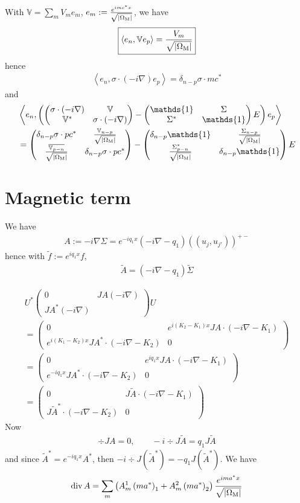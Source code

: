 \documentclass[11pt,a4paper,reqno,french,tikz]{amsart}
\newcommand{\pa}[1]{\left( #1 \right)} %
\newcommand{\ab}[1]{\left|#1\right|} %
\newcommand{\ps}[1]{\left< #1 \right>} %
\newcommand{\na}{\nabla} %
\newcommand{\f}[2]{\frac{#1}{#2}} %
\newcommand{\ind}[1]{_{\textup{#1}}} %
\newcommand{\mat}[1]{\begin{pmatrix} #1 \end{pmatrix}} %
\def\1{{\mathds{1}}}
\newcommand{\bbV}{\mathbb{V}}
\newcommand{\db}[1]{\left(\!\left( #1 \right)\!\right)}
\def\bbV{{\mathbb V}}
\def\1{{\mathds{1}}}
\newcommand{\sqom}{\sqrt{\ab{\Omega\ind{M}}}}
\begin{document}
With $\bbV = \sum_m V_m e_m$, $e_m := \f{e^{imc^*x}}{\sqom}$, we have
\begin{align*}
\boxed{\ps{e_n,\bbV e_p} = \f{V_m}{\sqom}}
\end{align*}
hence
\begin{align*}
\ps{e_n, \sigma \cdot \pa{-i\na} e_p} = \delta_{n-p} \sigma \cdot mc^*
\end{align*}
and
\begin{align*}
	&\ps{e_n,\pa{\mat{\sigma\cdot\pa{-i\na} & \bbV \\ \bbV^* & \sigma\cdot\pa{-i\na}} - \mat{\1 & \Sigma \\ \Sigma^* & \1} E } e_p} \\
	&= \mat{ \delta_{n-p} \sigma\cdot pc^* & \f{\bbV_{n-p}}{\sqom} \\ \f{\overline{\bbV_{p-n}}}{\sqom} & \delta_{n-p} \sigma\cdot pc^*} - \mat{\delta_{n-p} \1 & \f{\Sigma_{n-p}}{\sqom} \\ \f{\Sigma_{p-n}^*}{\sqom} & \delta_{n-p} \1} E
\end{align*}

\section{Magnetic term}%
\label{sub:magnetic_term}

We have
\begin{align*}
A := -i\na \Sigma = e^{-iq_1 x} \pa{-i\na - q_1} \db{u_j,u_{j'}}^{+-}
\end{align*}
hence with $\widetilde{f} := e^{iq_1 x} f$,
\begin{align*}
\widetilde{A} = \pa{-i\na - q_1} \widetilde{\Sigma}
\end{align*}

\begin{multline*}
	U^* \mat{0 & JA (-i\na) \\ JA^* (-i\na)} U \\
	= \mat{0 & e^{i(K_2 - K_1)x} JA \cdot(-i\na - K_1) \\ e^{i(K_1 - K_2)x} JA^* \cdot(-i\na - K_2) & 0} \\
	= \mat{0 & e^{iq_1 x} JA \cdot(-i\na - K_1) \\ e^{-iq_1 x} JA^* \cdot(-i\na - K_2) & 0} \\
	= \mat{0 & J \widetilde{A} \cdot(-i\na - K_1) \\  J\widetilde{A}^* \cdot(-i\na - K_2) & 0}
\end{multline*}
Now
\begin{align*}
\div JA = 0,\qquad -i\div J \widetilde{A} = q_1 J \widetilde{A}
\end{align*}
and since $\widetilde{A}^* = e^{-iq_1 x} A^*$, then $-i\div J \pa{\widetilde{A}^*} = -q_1 J  \pa{\widetilde{A}^*}$. We have
\begin{align*}
\div A = \sum_m \pa{A_m^1 \pa{m a^*}_1 + A_m^2 \pa{m a^*}_2} \f{e^{ima^*x}}{\sqom}
\end{align*}
\end{document}
